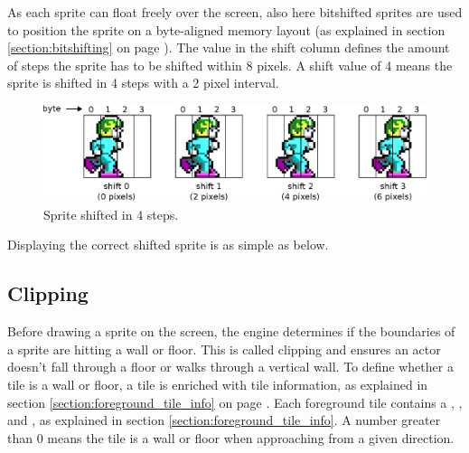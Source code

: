 \documentclass[book.tex]{subfiles}
\begin{document}
\par
As each sprite can float freely over the screen, also here bitshifted sprites are used to position the sprite on a byte-aligned memory layout (as explained in section \ref{section:bitshifting} on page \pageref{section:bitshifting}). The value in the shift column defines the amount of steps the sprite has to be shifted within 8 pixels. A shift value of 4 means the sprite is shifted in 4 steps with a 2 pixel interval.\\ 

\begin{figure}[H]
  \centering
  \includegraphics[width=\textwidth]{imgs/drawings/sprite_shift.eps}
  \caption{Sprite shifted in 4 steps.}
  \label{fig:sprite_shift}  
\end{figure}
\par
Displaying the correct shifted sprite is as simple as below.
\\
\par
\begin{minipage}{\textwidth}
  
\end{minipage}
\label{state_type}
\par


\subsection{Clipping}
\label{section:clipping}
Before drawing a sprite on the screen, the engine determines if the boundaries of a sprite are hitting a wall or floor. This is called clipping and ensures an actor doesn't fall through a floor or walks through a vertical wall. To define whether a tile is a wall or floor, a tile is enriched with tile information, as explained in section \ref{section:foreground_tile_info} on page \pageref{section:foreground_tile_info}. Each foreground tile contains a , ,  and , as explained in section \ref{section:foreground_tile_info}. A number greater than 0 means the tile is a wall or floor when approaching from a given direction. 
\end{document}
